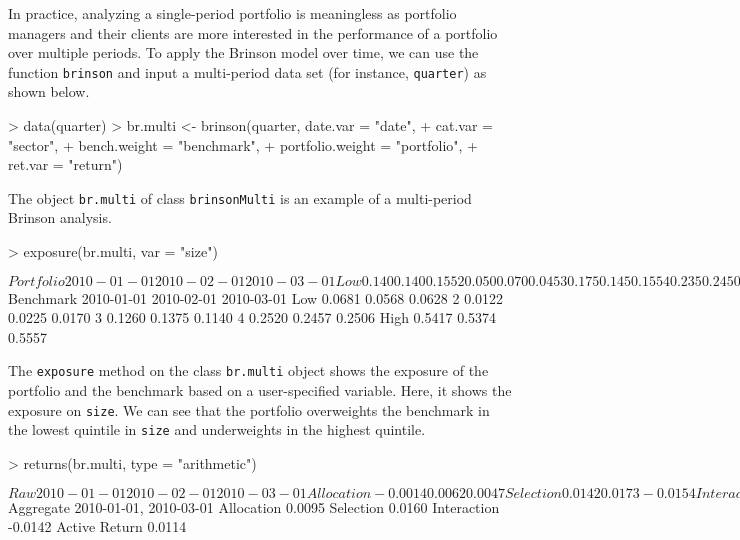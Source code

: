 In practice, analyzing a single-period portfolio is meaningless as
portfolio managers and their clients are more interested in the
performance of a portfolio over multiple periods. To apply the Brinson
model over time, we can use the function \texttt{brinson} and input a
multi-period data set (for instance, \texttt{quarter}) as shown
below. 

\begin{Schunk}
\begin{Sinput}
> data(quarter)
> br.multi <- brinson(quarter, date.var = "date",
+                 cat.var = "sector",
+                 bench.weight = "benchmark",
+                 portfolio.weight = "portfolio",
+                 ret.var = "return")
\end{Sinput}
\end{Schunk}


The object \texttt{br.multi} of class \texttt{brinsonMulti} is an
example of a multi-period Brinson analysis.

\begin{Schunk}
\begin{Sinput}
> exposure(br.multi, var = "size")
\end{Sinput}
\begin{Soutput}
$Portfolio
     2010-01-01 2010-02-01 2010-03-01
Low       0.140      0.140      0.155
2         0.050      0.070      0.045
3         0.175      0.145      0.155
4         0.235      0.245      0.240
High      0.400      0.400      0.405

$Benchmark
     2010-01-01 2010-02-01 2010-03-01
Low      0.0681     0.0568     0.0628
2        0.0122     0.0225     0.0170
3        0.1260     0.1375     0.1140
4        0.2520     0.2457     0.2506
High     0.5417     0.5374     0.5557
\end{Soutput}
\end{Schunk}

The \texttt{exposure} method on the class \texttt{br.multi} object
shows the exposure of the portfolio and the benchmark based on a
user-specified variable. Here, it shows the exposure on
\texttt{size}. We can see that the portfolio overweights the benchmark
in the lowest quintile in \texttt{size} and underweights in the
highest quintile.

\begin{Schunk}
\begin{Sinput}
> returns(br.multi, type = "arithmetic")
\end{Sinput}
\begin{Soutput}
$Raw
              2010-01-01 2010-02-01 2010-03-01
Allocation       -0.0014     0.0062     0.0047
Selection         0.0142     0.0173    -0.0154
Interaction       0.0019    -0.0072    -0.0089
Active Return     0.0147     0.0163    -0.0196

$Aggregate
              2010-01-01, 2010-03-01
Allocation                    0.0095
Selection                     0.0160
Interaction                  -0.0142
Active Return                 0.0114
\end{Soutput}
\end{Schunk}

